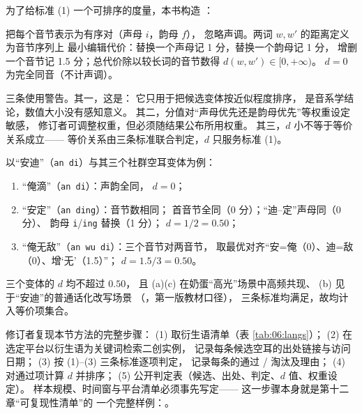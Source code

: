 为了给标准 (1) 一个可排序的度量，本书构造
：

\begin{definition}\label{def:08:dist}
  把每个音节表示为有序对（声母 $i$，韵母 $f$），
  忽略声调。两词 $w, w'$ 的距离定义为音节序列上
  最小编辑代价：替换一个声母记 1 分，替换一个韵母记 1 分，
  增删一个音节记 1.5 分；总代价除以较长词的音节数得
   $d(w,w') \in [0, +\infty)$。
  $d=0$ 为完全同音（不计声调）。
\end{definition}

三条使用警告。其一，这是：
它只用于把候选变体按近似程度排序，
是音系学结论，数值大小没有感知意义。
其二，分值对“声母优先还是韵母优先”等权重设定敏感，
修订者可调整权重，但必须随结果公布所用权重。
其三，$d$ 小不等于等价关系成立——
等价关系由三条标准联合判定，$d$ 只服务标准 (1)。

\begin{example}[演示计算]\label{ex:08:dist}
  以“安迪”（\texttt{an di}）与其三个社群空耳变体为例：
  \begin{enumerate}[label=(\alph*),leftmargin=2.2em]
    \item “俺滴”（\texttt{an di}）：声韵全同，
          $d = 0$；
    \item “安定”（\texttt{an ding}）：音节数相同；
          首音节全同（0 分）；“迪--定”声母同（0 分）、
          韵母 \texttt{i}/\texttt{ing} 替换（1 分）；
          $d = 1/2 = 0.50$；
    \item “俺无敌”（\texttt{an wu di}）：三个音节对两音节，
          取最优对齐“安=俺（0）、迪=敌（0）、增‘无’（1.5）”；
          $d = 1.5/3 = 0.50$。
  \end{enumerate}
  三个变体的 $d$ 均不超过 $0.50$，
  且 (a)(c) 在奶蛋“高光”场景中高频共现、
  (b) 见于“安迪”的普通话化改写场景
  （，第一版教材口径），
  三条标准均满足，故均计入等价项集合。
\end{example}

\begin{nlmethod}
  修订者复现本节方法的完整步骤：
  (1) 取衍生语清单（表 \ref{tab:06:langs}）；
  (2) 在选定平台以衍生语为关键词检索二创实例，
      记录每条候选空耳的出处链接与访问日期；
  (3) 按 (1)--(3) 三条标准逐项判定，
      记录每条的通过 / 淘汰及理由；
  (4) 对通过项计算 $d$ 并排序；
  (5) 公开判定表（候选、出处、判定、$d$ 值、权重设定）。
  样本规模、时间窗与平台清单必须事先写定——
  这一步骤本身就是第十二章“可复现性清单”的
  一个完整样例：。
\end{nlmethod}

